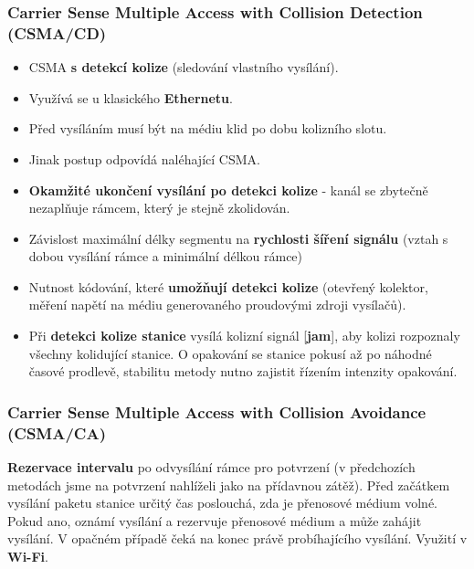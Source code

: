 \subsubsection*{Carrier Sense Multiple Access with Collision Detection (CSMA/CD)}
\begin{itemize}
\item CSMA \textbf{s detekcí kolize} (sledování vlastního vysílání).
\item Využívá se u klasického \textbf{Ethernetu}.
\item Před vysíláním musí být na médiu klid po dobu kolizního slotu.
\item Jinak postup odpovídá naléhající CSMA.
\item \textbf{Okamžité ukončení vysílání po detekci kolize} - kanál se zbytečně nezaplňuje rámcem, který je stejně zkolidován.
\item Závislost maximální délky segmentu na \textbf{rychlosti šíření signálu} (vztah s dobou vysílání rámce a minimální délkou rámce)
\item Nutnost kódování, které \textbf{umožňují detekci kolize} (otevřený kolektor, měření napětí na médiu generovaného proudovými zdroji vysílačů).
\item Při \textbf{detekci kolize stanice }vysílá kolizní signál [\textbf{jam}], aby kolizi rozpoznaly všechny kolidující stanice. O opakování se stanice pokusí až po náhodné časové prodlevě, stabilitu metody nutno zajistit řízením intenzity opakování.
\end{itemize}

\subsubsection*{Carrier Sense Multiple Access with Collision Avoidance (CSMA/CA)}
\textbf{Rezervace intervalu} po odvysílání rámce pro potvrzení (v předchozích metodách jsme na potvrzení nahlíželi jako na  přídavnou zátěž). Před začátkem vysílání paketu stanice určitý čas poslouchá, zda je přenosové médium volné. Pokud ano, oznámí vysílání a rezervuje přenosové médium a může zahájit vysílání. V opačném případě čeká na konec právě probíhajícího vysílání. Využití v \textbf{Wi-Fi}.
